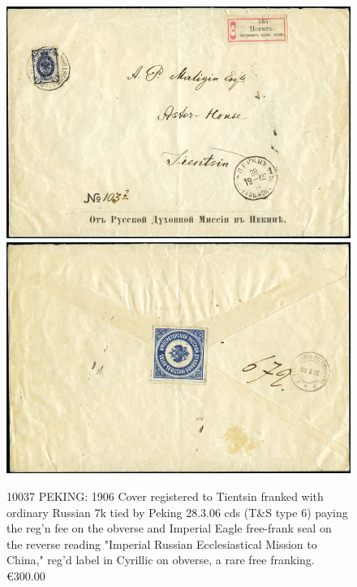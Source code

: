 \begin{figure}[htbp]
\centering
\includegraphics[width=.95\textwidth]{../russian-post-offices-in-china/10037.jpg}
\includegraphics[width=.95\textwidth]{../russian-post-offices-in-china/10037-1.jpg}
\caption{
10037	PEKING: 1906 Cover registered to Tientsin franked with ordinary 
Russian 7k tied by Peking 28.3.06 cds (T\&S type 6) paying the reg'n 
fee on the obverse and Imperial Eagle free-frank seal on the reverse 
reading "Imperial Russian Ecclesiastical Mission to China," reg'd label 
in Cyrillic on obverse, a rare free franking.
\euro 300.00
}  
\end{figure}

